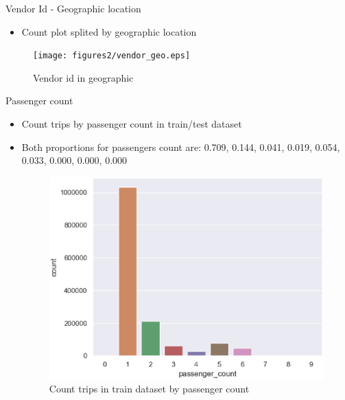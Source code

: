 \documentclass[
 size=12pt,
 paper=smartboard, %
 mode=present, %
 display=slides, %
style=tuliplab,
pauseslide,
fleqn,leqno]{powerdot}
\begin{document}
\begin{slide}{Vendor Id - Geographic location}
  \begin{itemize}
    \item Count plot splited by geographic location
  \end{itemize}
  \begin{figure}[h]
    \centering
    \texttt{[image: figures2/vendor\_geo.eps]}
    \caption{Vendor id in geographic}
    \label{fig:categories-picture}
  \end{figure}
\end{slide}


\begin{slide}{Passenger count}
  \begin{itemize}
    \item Count trips by passenger count in train/test dataset
    \item Both proportions for passengers count are: 0.709, 0.144, 0.041, 0.019, 0.054, 0.033, 0.000, 0.000, 0.000 \pause
    \begin{figure}[h]
      \begin{minipage}[t]{0.4\linewidth}
        \centering
        \includegraphics[width=1.0\textwidth]{figures2/passenger_count_train.eps}
        \caption{Count trips in train dataset by passenger count}
        \label{fig:count-by-passenger-count}
      \end{minipage}
      \pause
      \hfill
      \begin{minipage}[t]{0.4\linewidth}
        \centering

\end{minipage}
\end{figure}
\end{itemize}
\end{slide}
\end{document}
